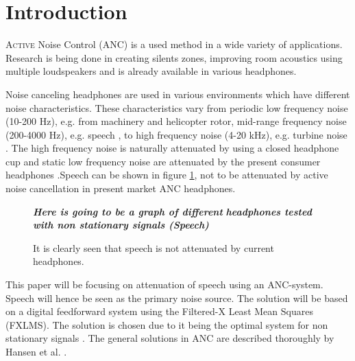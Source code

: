 \section{Introduction}
\lettrine[lines=2]{A}{ctive} Noise Control (ANC) is a used method in a wide variety of applications. Research is being done in creating silents zones\cite{SilentZones}, improving room acoustics using multiple loudspeakers\cite{CAPS} and is already available in various headphones.

Noise canceling headphones are used in various environments which have different noise characteristics. These characteristics vary from periodic low frequency noise (10-200 Hz), e.g. from machinery and helicopter rotor\cite{LowFrequency}, mid-range frequency noise (200-4000 Hz), e.g. speech \cite{MidFrequency}, to high frequency noise (4-20 kHz), e.g. turbine noise \cite{LowFrequency}. The high frequency noise is naturally attenuated by using a closed headphone cup \cite{naturalAttenuation} and static low frequency noise are attenuated by the present consumer headphones \cite{naturalAttenuation}.Speech can be shown in figure \ref{fig:ANCcompare}, not to be attenuated by active noise cancellation in present market ANC headphones.

\begin{figure}[H]
	\centering
	\textbf{\textit{Here is going to be a graph of different}}
	\textbf{\textit{ headphones tested with non stationary signals (Speech)}}
	\caption{It is clearly seen that speech is not attenuated by current headphones.}
	\label{fig:ANCcompare}
\end{figure}


This paper will be focusing on attenuation of speech using an ANC-system. Speech will hence be seen as the primary noise source. The solution will be based on a digital feedforward system using the Filtered-X Least Mean Squares (FXLMS). The solution is chosen due to it being the optimal system for non stationary signals \cite{Hansen2}. The general solutions in ANC are described thoroughly by Hansen et al. \cite{Hansen}.

